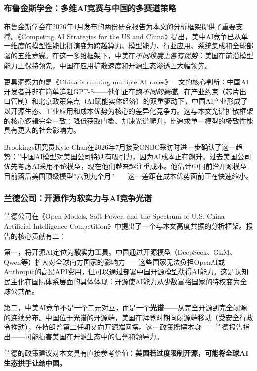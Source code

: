 
\subsubsection{布鲁金斯学会：多维AI竞赛与中国的多赛道策略}

布鲁金斯学会在2026年4月发布的两份研究报告为本文的分析框架提供了重要支撑。《Competing AI Strategies for the US and China》提出，美中AI竞争已从单一维度的模型性能比拼演变为跨越算力、模型能力、行业应用、系统集成和全球部署的五维竞赛。在这一多维框架下，中美在\emph{不同维度上各有优势}：美国在前沿模型能力上保持领先，中国在应用扩散速度和开源生态渗透上大幅领先。

更具洞察力的是《China is running multiple AI races》一文的核心判断：中国AI开发者并非在简单追赶GPT-5——他们正在跑\emph{不同的赛道}。在产业约束（芯片出口管制）和北京政策焦点（AI赋能实体经济）的双重驱动下，中国AI产业形成了以开源生态、工业应用和成本优势为核心的差异化竞争力。这与本文光谱扩散框架的核心逻辑完全一致：降低获取门槛、加速光谱爬升，比追求单一模型的极致性能具有更大的社会影响力。

Brookings研究员Kyle Chan在2026年7月接受CNBC采访时进一步确认了这一趋势：''中国AI模型对美国公司特别有吸引力，因为AI成本正在飙升。过去美国公司优先考虑AI采用不论模型，现在他们越来越注重成本。他估计中国前沿开源模型目前落后美国顶级模型''六到九个月''——这一差距在成本优势面前正在快速缩小。

\subsubsection{兰德公司：开源作为软实力与AI竞争光谱}

兰德公司在《Open Models, Soft Power, and the Spectrum of U.S.-China Artificial Intelligence Competition》中提出了一个与本文高度共振的分析框架。报告的核心贡献有二：

第一，将开源AI定位为\textbf{软实力工具}。中国通过开源模型（DeepSeek、GLM、Qwen等）扩大对全球南方国家的影响力——这些国家无法负担OpenAI或Anthropic的高昂API费用，但可以通过部署中国开源模型获得AI能力。这是认知民主化在国际体系层面的具体体现：开源使AI能力从少数富裕国家的特权变为全球公共品。

第二，中美AI竞争不是一个二元对立，而是一个\textbf{光谱}——从完全开源到完全闭源的连续分布。中国位于光谱的开源端，美国在拜登时期向闭源端移动（受安全行政令推动），在特朗普第二任期又向开源端回摆。这一政策摇摆本身——兰德报告指出——可能损害美国在开源生态中的信誉和领导力。

兰德的政策建议对本文具有直接参考价值：\textbf{美国若过度限制开源，可能将全球AI生态拱手让给中国。}

